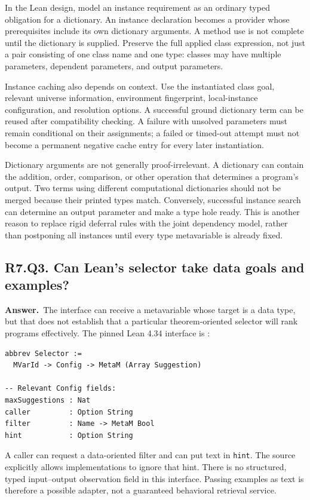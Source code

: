 \documentclass[11pt,a4paper]{article}
\theoremstyle{definition}
\theoremstyle{remark}
\newcommand{\code}[1]{\texttt{#1}}
\newcommand{\answer}{\par\noindent\textbf{Answer.}\ }
\newcommand{\qheading}[2]{\subsection{#1. #2}}
\begin{document}
In the Lean design, model an instance requirement as an ordinary typed
obligation for a dictionary. An instance declaration becomes a provider whose
prerequisites include its own dictionary arguments. A method use is not
complete until the dictionary is supplied. Preserve the full applied class
expression, not just a pair consisting of one class name and one type: classes
may have multiple parameters, dependent parameters, and output parameters.

Instance caching also depends on context. Use the instantiated class goal,
relevant universe information, environment fingerprint, local-instance
configuration, and resolution options. A successful ground dictionary term
can be reused after compatibility checking. A failure with unsolved parameters
must remain conditional on their assignments; a failed or timed-out attempt
must not become a permanent negative cache entry for every later instantiation.

Dictionary arguments are not generally proof-irrelevant. A dictionary can
contain the addition, order, comparison, or other operation that determines a
program's output. Two terms using different computational dictionaries should
not be merged because their printed types match. Conversely, successful
instance search can determine an output parameter and make a type hole ready.
This is another reason to replace rigid deferral rules with the joint dependency
model, rather than postponing all instances until every type metavariable is
already fixed.

\qheading{R7.Q3}{Can Lean's selector take data goals and examples?}
\answer The interface can receive a metavariable whose target is a data type,
but that does not establish that a particular theorem-oriented selector will
rank programs effectively. The pinned Lean 4.34 interface is
\cite{leanselector}:
\par\noindent\begin{minipage}{\linewidth}
\begin{lstlisting}
abbrev Selector :=
  MVarId -> Config -> MetaM (Array Suggestion)

-- Relevant Config fields:
maxSuggestions : Nat
caller         : Option String
filter         : Name -> MetaM Bool
hint           : Option String
\end{lstlisting}
\end{minipage}\par
A caller can request a data-oriented filter and can put text in \code{hint}.
The source explicitly allows implementations to ignore that hint. There is no
structured, typed input--output observation field in this interface. Passing
examples as text is therefore a possible adapter, not a guaranteed behavioral
retrieval service.
\end{document}
